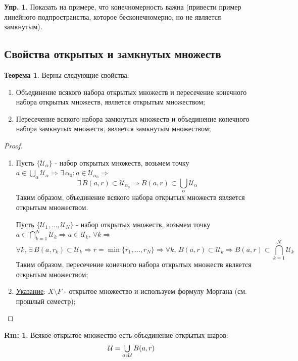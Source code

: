 \documentclass[12pt]{article}
\newcommand{\MU}{\mathcal{U}}
\theoremstyle{definition}
\newtheorem{rem}{Rm:}
\newtheorem{exrc}{Упр.}
\newtheorem{theorem}{Теорема}
\newcommand{\smallerrel}[1]{\mathrel{\mathpalette\smallerrelaux{#1}}}
\newcommand{\smallerrelaux}[2]{\raisebox{.1ex}{\scalebox{.75}{$#1#2$}}}
\newcommand{\smallin}{\smallerrel{\in}}
\begin{document}
\begin{exrc}
	Показать на примере, что конечномерность важна (привести пример линейного подпространства, которое бесконечномерно, но не является замкнутым). 
\end{exrc}
\subsection*{Свойства открытых и замкнутых множеств}
\begin{theorem} 
	Верны следующие свойства:
	\begin{enumerate}[label ={(\arabic*)}]
		\item Объединение всякого набора открытых множеств и пересечение конечного набора открытых множеств, является открытым множеством;
		\item Пересечение всякого набора замкнутых множеств и объединение конечного набора замкнутых множеств, является замкнутым множеством;
	\end{enumerate}
\end{theorem}
\begin{proof}
	\begin{enumerate}[label ={(\arabic*)}]
		\item Пусть $\{\MU_\alpha\}$ - набор открытых множеств, возьмем точку $a \in \textstyle \bigcup\limits_{\alpha}\MU_\alpha \Rightarrow \exists \, \alpha_0 \colon a \in \MU_{\alpha_0} \Rightarrow$ 
		$$
			\exists \, B(a,r)\subset \MU_{\alpha_0} \Rightarrow B(a,r) \subset \textstyle \bigcup\limits_{\alpha}\MU_\alpha
		$$
		Таким образом, объединение всякого набора открытых множеств является открытым множеством.
		
		Пусть $\{\MU_1,\dotsc, \MU_N\}$ - набор открытых множеств, возьмем точку $a \in \textstyle \bigcap\limits_{k = 1}^{N}\MU_k \Rightarrow a \in \MU_k, \, \forall k \Rightarrow$
		$$
			\forall k,\, \exists \, B(a,r_k)\subset \MU_k \Rightarrow r = \min\{r_1,\dotsc, r_N\} \Rightarrow \forall k,\, B(a,r) \subset \MU_k \Rightarrow B(a,r) \subset \textstyle \bigcap\limits_{k = 1}^{N}\MU_k
		$$
		Таким образом, пересечение конечного набора открытых множеств является открытым множеством;
		\item \uline{Указание}: $X \setminus F$ - открытое множество и используем формулу Моргана (см. прошлый семестр);
	\end{enumerate}
\end{proof}
\begin{rem}
	Всякое открытое множество есть объединение открытых шаров:
	$$
		\MU = \textstyle\bigcup\limits_{a \smallin \MU}B(a,r)
	$$
\end{rem}
\newpage
\end{document}
